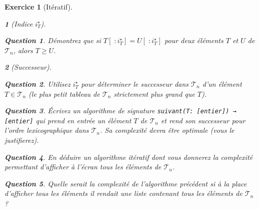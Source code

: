 \documentclass{article}
\theoremstyle{exostyle}
\newtheorem{exo}{Exercice}
\theoremstyle{partiestyle}
\newtheorem{partie}{}[exo]
\theoremstyle{questionstyle}
\newtheorem{questionpartie}{Question}[partie]
\begin{document}
\begin{exo}[Itératif]
\begin{partie}[Indice $i^\star_{T}$]
        \begin{questionpartie}
            Démontrez que si $T[\;:i^\star_{T}] = U[\;:i^\star_{T}]$ pour deux éléments $T$ et $U$ de $\mathcal{T}_n$, alors $T \geq U$.
        \end{questionpartie}
    \end{partie}
    \begin{partie}[Successeur]
        \begin{questionpartie}
            Utilisez $i^\star_{T}$ pour déterminer le successeur dans $\mathcal{T}_n$ d'un élément $T \in \mathcal{T}_n$ (le plus petit tableau de $\mathcal{T}_n$ strictement plus grand que $T$).
        \end{questionpartie}
        \begin{questionpartie}
            Écrivez un algorithme de signature \verb|suivant(T: [entier]) → [entier]|  qui prend en entrée un élément $T$ de $\mathcal{T}_n$ et rend son successeur pour l'ordre lexicographique dans $\mathcal{T}_n$. Sa complexité devra être optimale (vous le justifierez).
        \end{questionpartie}
        \begin{questionpartie}
            En déduire un algorithme itératif dont vous donnerez la complexité permettant d'afficher à l'écran tous les éléments de $\mathcal{T}_n$.
        \end{questionpartie}
        \begin{questionpartie}
            Quelle serait la complexité de l'algorithme précédent si à la place d'afficher tous les éléments il rendait une liste contenant tous les éléments de $\mathcal{T}_n$ ?
        \end{questionpartie}

    \end{partie}
\end{exo}
\end{document}
